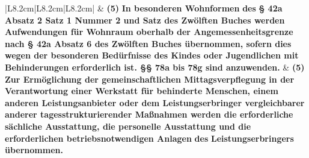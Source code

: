 \documentclass[10pt,a4paper,landscape]{article}
\begin{document}
\begin{longtable}{|L{8.2cm}|L{8.2cm}|L{8.2cm}|}
\hhline{|---|}
 & \textbf{(5) }\textbf{\textcolor{diffred}{In besonderen Wohnformen}}\textbf{ des }\textbf{\textcolor{diffred}{\S{}  \newline 42a Absatz 2 Satz 1 Nummer 2 und Satz   des Zwölften Buches werden  \newline Aufwendungen für Wohnraum oberhalb  \newline der Angemessenheitsgrenze nach \S{} 42a  \newline Absatz 6 des Zwölften Buches  \newline übernommen, sofern dies wegen der  \newline besonderen Bedürfnisse des Kindes  \newline oder Jugendlichen mit Behinderungen  \newline erforderlich ist. \S{}\S{} 78a bis 78g sind  \newline anzuwenden.}} & \textbf{(5) }\textbf{\textcolor{diffgreen}{Zur Ermöglichung der  \newline gemeinschaftlichen Mittagsverpflegung  \newline in der Verantwortung einer Werkstatt für  \newline behinderte Menschen, einem anderen  \newline Leistungsanbieter oder dem  \newline Leistungserbringer vergleichbarer  \newline anderer tagesstrukturierender  \newline Maßnahmen werden die erforderliche  \newline sächliche Ausstattung, die personelle  \newline Ausstattung und die erforderlichen  \newline betriebsnotwendigen Anlagen}}\textbf{ des} \newline \textbf{\textcolor{diffgreen}{Leistungserbringers übernommen.}} \\
\hhline{|---|}

\end{longtable}
\end{document}

